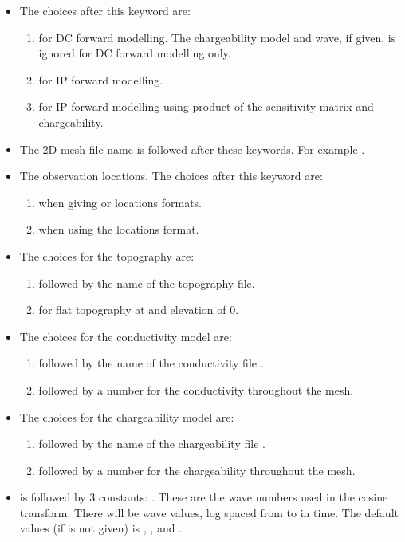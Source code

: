 \begin{itemize}
\item[\fileName{FWD}] The choices after this keyword are: 
\begin{enumerate}
\item{} for DC forward modelling. The chargeability model and wave, if given, is ignored for DC forward modelling only.
\item{} for IP forward modelling.
\item{} for IP forward modelling using product of the sensitivity matrix and chargeability. 
\end{enumerate}
%
\item[\fileName{MESH FILE}] The 2D mesh file name is followed after these keywords. For example .
%
\item[\fileName{LOC}] The observation locations. The choices after this keyword are:
\begin{enumerate}
\item{} when giving  or  locations formats.
\item{} when using the  locations format.
\end{enumerate}
%
\item[\fileName{TOPO}] The choices for the topography are:
\begin{enumerate}
\item{} followed by the name of the topography file.
\item{} for flat topography at and elevation of 0.
\end{enumerate}
%
\item[\fileName{COND}] The choices for the conductivity model are:
\begin{enumerate}
\item{} followed by the name of the conductivity file .
\item{} followed by a number for the conductivity throughout the mesh.
\end{enumerate}
%
\item[\fileName{CHG}] The choices for the chargeability model are:
\begin{enumerate}
\item{} followed by the name of the chargeability file .
\item{} followed by a number for the chargeability throughout the mesh.
\end{enumerate}
%
\item[\fileName{WAVE}] is followed by 3 constants: . These are the wave numbers used in the cosine transform. There will be  wave values, log spaced from  to  in time. The default values (if  is not given) is , , and .
\end{itemize}

